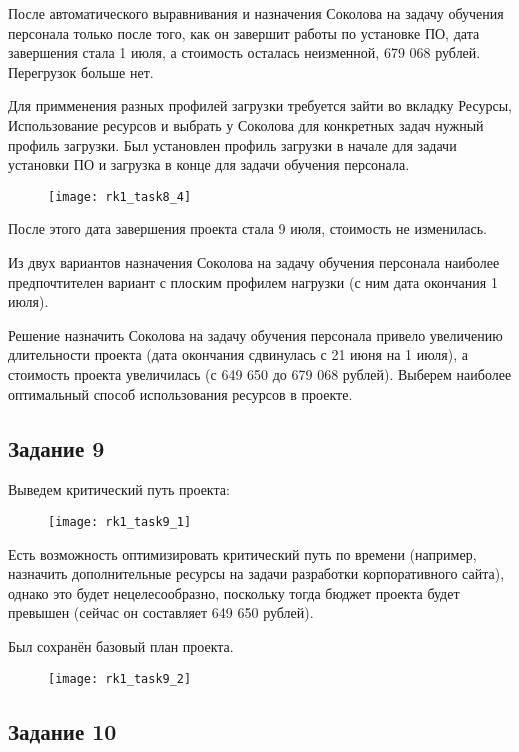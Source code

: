 После автоматического выравнивания и назначения Соколова на задачу обучения персонала только после того, как он завершит работы по установке ПО, дата завершения стала  1 июля, а стоимость осталась неизменной, 679 068 рублей. Перегрузок больше нет.

Для примменения разных профилей загрузки требуется зайти во вкладку Ресурсы, Использование ресурсов и выбрать у Соколова для конкретных задач нужный профиль загрузки. Был установлен профиль загрузки в начале для задачи установки ПО и загрузка в конце для задачи обучения персонала. 

\begin{figure}[h!]
	\texttt{[image: rk1\_task8\_4]}
\end{figure}


После этого дата завершения проекта стала 9 июля, стоимость не изменилась.

Из двух вариантов назначения Соколова на задачу обучения персонала наиболее предпочтителен вариант с плоским профилем нагрузки (с ним дата окончания 1 июля).

Решение назначить Соколова на задачу обучения персонала привело увеличению длительности проекта (дата окончания сдвинулась с 21 июня на 1 июля), а стоимость проекта увеличилась (с 649 650 до 679 068 рублей). Выберем наиболее оптимальный способ использования ресурсов в проекте.

\subsection*{Задание 9}

Выведем критический путь проекта:

\begin{figure}[h!]
	\texttt{[image: rk1\_task9\_1]}
\end{figure}

Есть возможность оптимизировать критический путь по времени (например, назначить дополнительные ресурсы на задачи разработки корпоративного сайта), однако это будет нецелесообразно, поскольку тогда бюджет проекта будет превышен (сейчас он составляет 649 650 рублей).

Был сохранён базовый план проекта.
\begin{figure}[h!]
	\texttt{[image: rk1\_task9\_2]}
\end{figure}

\subsection*{Задание 10}

